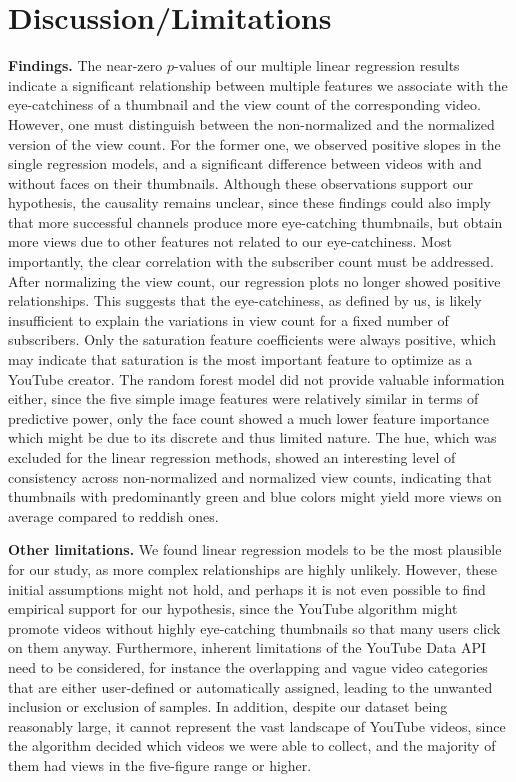 \documentclass{article}
\begin{document}
\section{Discussion/Limitations}
\textbf{Findings.} The near-zero $p$-values of our multiple linear regression results indicate a significant relationship between multiple features we associate with the eye-catchiness of a thumbnail and the view count of the corresponding video. However, one must distinguish between the non-normalized and the normalized version of the view count. For the former one, we observed positive slopes in the single regression models, and a significant difference between videos with and without faces on their thumbnails. Although these observations support our hypothesis, the causality remains unclear, since these findings could also imply that more successful channels produce more eye-catching thumbnails, but obtain more views due to other features not related to our eye-catchiness. Most importantly, the clear correlation with the subscriber count must be addressed. After normalizing the view count, our regression plots no longer showed positive relationships. This suggests that the eye-catchiness, as defined by us, is likely insufficient to explain the variations in view count for a fixed number of subscribers. Only the saturation feature coefficients were always positive, which may indicate that saturation is the most important feature to optimize as a YouTube creator. The random forest model did not provide valuable information either, since the five simple image features were relatively similar in terms of predictive power, only the face count showed a much lower feature importance which might be due to its discrete and thus limited nature. The hue, which was excluded for the linear regression methods, showed an interesting level of consistency across non-normalized and normalized view counts, indicating that thumbnails with predominantly green and blue colors might yield more views on average compared to reddish ones.

\textbf{Other limitations.} We found linear regression models to be the most plausible for our study, as more complex relationships are highly unlikely. However, these initial assumptions might not hold, and perhaps it is not even possible to find empirical support for our hypothesis, since the YouTube algorithm might promote videos without highly eye-catching thumbnails so that many users click on them anyway. Furthermore, inherent limitations of the YouTube Data API need to be considered, for instance the overlapping and vague video categories that are either user-defined or automatically assigned, leading to the unwanted inclusion or exclusion of samples. In addition, despite our dataset being reasonably large, it cannot represent the vast landscape of YouTube videos, since the algorithm decided which videos we were able to collect, and the majority of them had views in the five-figure range or higher.
\end{document}

